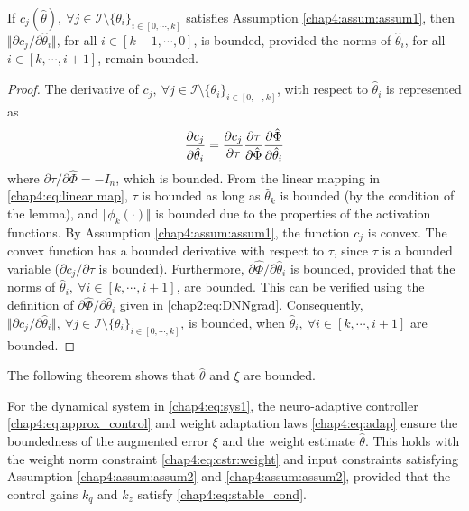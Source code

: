 \begin{lemma} 
    If $c_j(\hat\theta),\ \forall j\in\mathcal I \setminus \{\theta_i\}_{i\in[0,\cdots,k]}$ satisfies Assumption \ref{chap4:assum:assum1}, then $\Vert\partial c_j/\partial\hat\theta_i\Vert \allowbreak $, for all $i\in[k-1,\cdots, 0]$, is bounded, provided the norms of $\hat\theta_i$, for all $i\in[k,\cdots, i+1]$, remain bounded.
    \label{chap4:lem:lem2}
\end{lemma}

\begin{proof}

The derivative of $c_j,\ \forall j\in\mathcal I \setminus \{\theta_i\}_{i\in[0,\cdots,k]}$, with respect to $\hat\theta_i$ is represented as
\begin{equation}
    {\partial c_j\over\partial \hat\theta_i} = {\partial c_j\over\partial \tau} {\partial \tau\over\partial \hat\Phi} {\partial \hat\Phi\over\partial \hat\theta_i}
\end{equation}
where $\partial \tau/\partial \hat\Phi=-I_n$, which is bounded. 
From the linear mapping in \eqref{chap4:eq:linear map}, $\tau$ is bounded as long as $\hat\theta_k$ is bounded (by the condition of the lemma), and $\Vert\phi_k(\cdot)\Vert$ is bounded due to the properties of the activation functions. 
By Assumption \ref{chap4:assum:assum1}, the function $c_j$ is convex. 
The convex function has a bounded derivative with respect to $\tau$, since $\tau$ is a bounded variable (\ie $\partial c_j/\partial\tau$ is bounded). 
Furthermore, $\partial \hat\Phi/\partial \hat\theta_i$ is bounded, provided that the norms of $\hat\theta_i,\ \forall i \in[k,\cdots,i+1]$, are bounded. 
This can be verified using the definition of $\partial \hat\Phi/\partial\hat\theta_i$ given in \eqref{chap2:eq:DNNgrad}.
Consequently, $\Vert\partial c_j/\partial \hat\theta_i\Vert,\ \forall j\in\mathcal I \setminus \{\theta_i\}_{i\in[0,\cdots,k]}$, is bounded, when $\hat\theta_i,\ \forall i\in [k,\cdots,i+1]$ are bounded.

\end{proof}

The following theorem shows that $\hat\theta$ and $\xi$ are bounded.

\begin{theorem}
    For the dynamical system in \eqref{chap4:eq:sys1}, the neuro-adaptive controller \eqref{chap4:eq:approx_control} and weight adaptation laws \eqref{chap4:eq:adap} ensure the boundedness of the augmented error $\xi$ and the weight estimate $\hat \theta$. This holds with the weight norm constraint \eqref{chap4:eq:cstr:weight} and input constraints satisfying Assumption \ref{chap4:assum:assum2} and \ref{chap4:assum:assum2}, provided that the control gains ${k_q}$ and ${k_z}$ satisfy \eqref{chap4:eq:stable_cond}.
\end{theorem}

